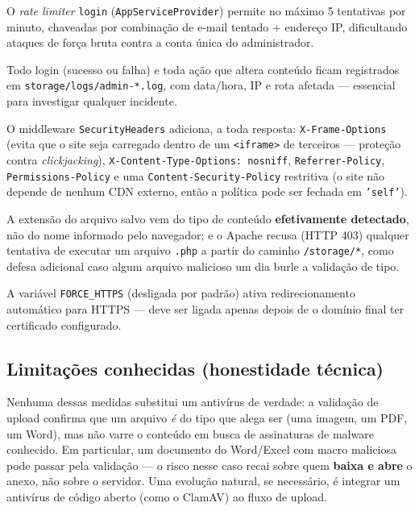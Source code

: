 \documentclass[11pt,a4paper]{article}
\begin{document}
\begin{description}[leftmargin=2em,style=nextline]
    \item[Limite de tentativas de login] O \emph{rate limiter} \texttt{login}
        (\texttt{AppServiceProvider}) permite no máximo 5 tentativas por minuto, chaveadas por
        combinação de e-mail tentado + endereço IP, dificultando ataques de força bruta contra a
        conta única do administrador.
    \item[Log de auditoria] Todo login (sucesso ou falha) e toda ação que altera conteúdo ficam
        registrados em \texttt{storage/logs/admin-*.log}, com data/hora, IP e rota afetada —
        essencial para investigar qualquer incidente.
    \item[Cabeçalhos HTTP de segurança] O middleware \texttt{SecurityHeaders} adiciona, a toda
        resposta: \texttt{X-Frame-Options} (evita que o site seja carregado dentro de um
        \texttt{<iframe>} de terceiros — proteção contra \emph{clickjacking}),
        \texttt{X-Content-Type-Options: nosniff}, \texttt{Referrer-Policy},
        \texttt{Permissions-Policy} e uma \texttt{Content-Security-Policy} restritiva (o site
        não depende de nenhum CDN externo, então a política pode ser fechada em
        \texttt{'self'}).
    \item[Uploads de arquivo] A extensão do arquivo salvo vem do tipo de conteúdo
        \textbf{efetivamente detectado}, não do nome informado pelo navegador; e o Apache
        recusa (HTTP 403) qualquer tentativa de executar um arquivo \texttt{.php} a partir do
        caminho \texttt{/storage/*}, como defesa adicional caso algum arquivo malicioso um dia
        burle a validação de tipo.
    \item[HTTPS opcional] A variável \texttt{FORCE\_HTTPS} (desligada por padrão) ativa
        redirecionamento automático para HTTPS — deve ser ligada apenas depois de o domínio
        final ter certificado configurado.
\end{description}

\subsection{Limitações conhecidas (honestidade técnica)}

Nenhuma dessas medidas substitui um antivírus de verdade: a validação de upload confirma que um
arquivo \emph{é} do tipo que alega ser (uma imagem, um PDF, um Word), mas não varre o conteúdo
em busca de assinaturas de malware conhecido. Em particular, um documento do Word/Excel com
macro maliciosa pode passar pela validação — o risco nesse caso recai sobre quem \textbf{baixa e
abre} o anexo, não sobre o servidor. Uma evolução natural, se necessário, é integrar um
antivírus de código aberto (como o ClamAV) ao fluxo de upload.
\end{document}
